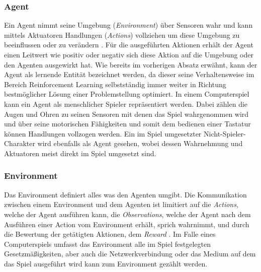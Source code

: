\documentclass[11pt]{scrartcl}
\begin{document}
\subsubsection{Agent}
Ein Agent nimmt seine Umgebung (\textit{Environment}) über Sensoren wahr und kann mittels Aktuatoren
Handlungen (\textit{Actions}) vollziehen um diese Umgebung zu beeinflussen oder zu verändern 
\cite[~S.60]{RN2009}. Für die ausgeführten Aktionen erhält der Agent einen Leitwert wie positiv oder
negativ sich diese Aktion auf die Umgebung oder den Agenten ausgewirkt hat. Wie bereits im vorherigen
Absatz erwähnt, kann der Agent als lernende Entität bezeichnet werden, da dieser seine Verhaltensweise
im Bereich  Reinforcement Learning selbstständig immer weiter in Richtung bestmöglicher Lösung einer 
Problemstellung optimiert. In einem Computerspiel kann ein Agent als menschlicher Spieler
repräsentiert werden. Dabei zählen die Augen und Ohren zu seinen Sensoren mit denen das Spiel
wahrgenommen wird und über seine motorischen Fähigkeiten und somit dem bedienen einer Tastatur
können Handlungen vollzogen werden. Ein im Spiel umgesetzter Nicht-Spieler-Charakter wird ebenfalls
als Agent gesehen, wobei dessen Wahrnehmung und Aktuatoren meist direkt im Spiel umgesetzt sind.


\subsubsection{Environment}
Das Environment definiert alles was den Agenten umgibt. Die Kommunikation zwischen einem Environment
und dem Agenten ist limitiert auf die \textit{Actions}, welche der Agent ausführen kann, die 
\textit{Observations}, welche der Agent nach dem Ausführen einer Action vom Environment erhält, 
sprich wahrnimmt, und durch die Bewertung der getätigten Aktionen, dem \textit{Reward} 
\cite[~S.5]{L2018}. Im Falle eines Computerspiels umfasst das Environment alle im Spiel festgelegten
Gesetzmäßigkeiten, aber auch die Netzwerkverbindung oder das Medium auf dem das Spiel ausgeführt
wird kann zum Environment gezählt werden.
\end{document}
